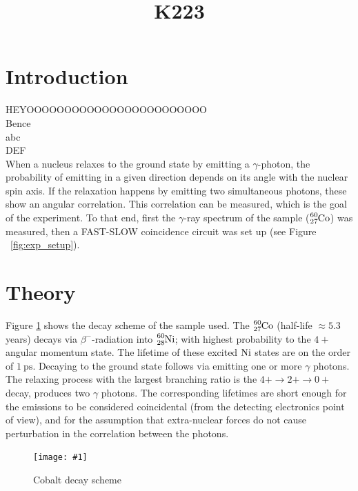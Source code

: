 \documentclass[twocolumn]{article}
\title{K223}
\newcommand{\insertFigure}[1]{%
   \texttt{[image: \#1]}%
}
\begin{document}
\maketitle
\newpage
\section{Introduction}
HEYOOOOOOOOOOOOOOOOOOOOOOOO\\
Bence\\
abc\\
DEF\\
When a nucleus relaxes to the ground state by emitting a $\gamma$-photon, the probability of emitting in a given direction depends on its angle with the nuclear spin axis. If the relaxation happens by emitting two simultaneous photons, these show an angular correlation. This correlation can be measured, which is the goal of the experiment. To that end, first the $\gamma$-ray spectrum of the sample ($\ce{_27^{60}Co}$) was measured, then a FAST-SLOW coincidence circuit was set up (see Figure ~\ref{fig:exp_setup}). 
\section{Theory}
Figure \ref{fig:cobalt_scheme} shows the decay scheme of the sample used. The $\ce{_27^{60}Co}$ (half-life $\approx 5.3$ years) decays via $\beta^-$-radiation into $\ce{_28^{60}Ni}$; with highest probability to the $4+$ angular momentum state. %
The lifetime of these excited $\ce{Ni}$ states are on the order of $\SI{1}{\pico\second}$. 
Decaying to the ground state follows via emitting one or more $\gamma$ photons. The relaxing process with the largest branching ratio is the $4+ \rightarrow 2+ \rightarrow 0+$ decay, produces two $\gamma$ photons. The corresponding lifetimes are short enough for the emissions to be considered coincidental (from the detecting electronics point of view), and for the assumption that extra-nuclear forces do not cause perturbation in the correlation between the photons.
\begin{figure}[!h]
\centering
\insertFigure{cobalt_scheme.png}
\caption{Cobalt decay scheme \cite{cobalt_scheme}}
\label{fig:cobalt_scheme}
\end{figure}
\end{document}
